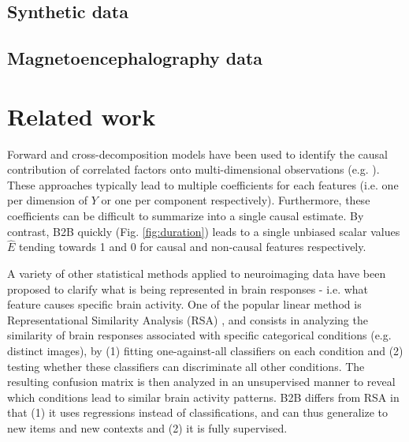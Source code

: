 \documentclass[preprint,12pt,3p]{elsarticle}
\begin{document}
\subsection{Synthetic data}
\label{sec:experiment_synthetic}



\subsection{Magnetoencephalography data}
\label{sec:experiment_real}



\section{Related work}

Forward and cross-decomposition models have been used to identify the causal
contribution of correlated factors onto multi-dimensional observations (e.g.
\citep{naselaris2011encoding}). These approaches typically lead to multiple
coefficients for each features (i.e. one per dimension of $Y$ or one per
component respectively). Furthermore, these coefficients can be difficult to
summarize into a single causal estimate. By contrast, B2B quickly (Fig.
\ref{fig:duration}) leads to a single unbiased scalar values $\hat E$ tending
towards 1 and 0 for causal and non-causal features respectively.

A variety of other statistical methods applied to neuroimaging data have been
proposed to clarify what is being represented in brain responses - i.e. what
feature causes specific brain activity. One of the popular linear method is
Representational Similarity Analysis (RSA)
\citep{kriegeskorte2008representational}, and consists in analyzing the
similarity of brain responses associated with specific categorical conditions
(e.g. distinct images), by (1) fitting one-against-all classifiers on each
condition and (2) testing whether these classifiers can discriminate all other
conditions. The resulting confusion matrix is then analyzed in an unsupervised
manner to reveal which conditions lead to similar brain activity patterns. B2B
differs from RSA in that (1) it uses regressions instead of classifications, and
can thus generalize to new items and new contexts and (2) it is fully
supervised.
\end{document}
